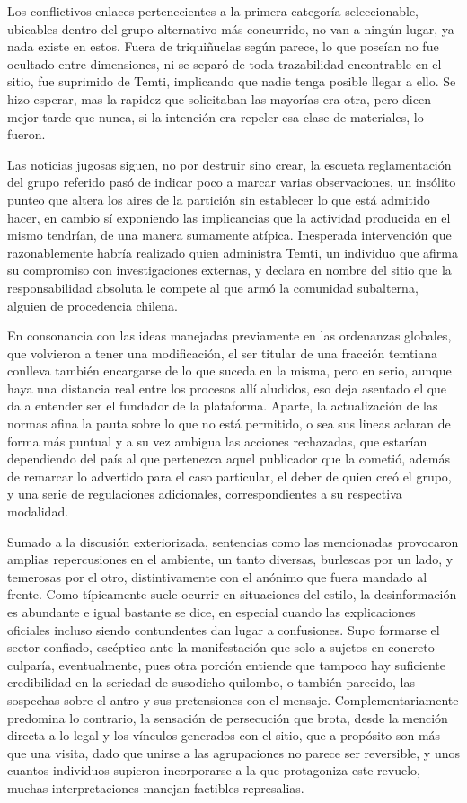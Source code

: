\documentclass[
]{book}
\begin{document}
Los conflictivos enlaces pertenecientes a la primera categoría seleccionable, ubicables dentro del grupo alternativo más concurrido, no van a ningún lugar, ya nada existe en estos. Fuera de triquiñuelas según parece, lo que poseían no fue ocultado entre dimensiones, ni se separó de toda trazabilidad encontrable en el sitio, fue suprimido de Temti, implicando que nadie tenga posible llegar a ello. Se hizo esperar, mas la rapidez que solicitaban las mayorías era otra, pero dicen mejor tarde que nunca, si la intención era repeler esa clase de materiales, lo fueron.

Las noticias jugosas siguen, no por destruir sino crear, la escueta reglamentación del grupo referido pasó de indicar poco a marcar varias observaciones, un insólito punteo que altera los aires de la partición sin establecer lo que está admitido hacer, en cambio sí exponiendo las implicancias que la actividad producida en el mismo tendrían, de una manera sumamente atípica. Inesperada intervención que razonablemente habría realizado quien administra Temti, un individuo que afirma su compromiso con investigaciones externas, y declara en nombre del sitio que la responsabilidad absoluta le compete al que armó la comunidad subalterna, alguien de procedencia chilena.

En consonancia con las ideas manejadas previamente en las ordenanzas globales, que volvieron a tener una modificación, el ser titular de una fracción temtiana conlleva también encargarse de lo que suceda en la misma, pero en serio, aunque haya una distancia real entre los procesos allí aludidos, eso deja asentado el que da a entender ser el fundador de la plataforma. Aparte, la actualización de las normas afina la pauta sobre lo que no está permitido, o sea sus lineas aclaran de forma más puntual y a su vez ambigua las acciones rechazadas, que estarían dependiendo del país al que pertenezca aquel publicador que la cometió, además de remarcar lo advertido para el caso particular, el deber de quien creó el grupo, y una serie de regulaciones adicionales, correspondientes a su respectiva modalidad.

Sumado a la discusión exteriorizada, sentencias como las mencionadas provocaron amplias repercusiones en el ambiente, un tanto diversas, burlescas por un lado, y temerosas por el otro, distintivamente con el anónimo que fuera mandado al frente. Como típicamente suele ocurrir en situaciones del estilo, la desinformación es abundante e igual bastante se dice, en especial cuando las explicaciones oficiales incluso siendo contundentes dan lugar a confusiones. Supo formarse el sector confiado, escéptico ante la manifestación que solo a sujetos en concreto culparía, eventualmente, pues otra porción entiende que tampoco hay suficiente credibilidad en la seriedad de susodicho quilombo, o también parecido, las sospechas sobre el antro y sus pretensiones con el mensaje. Complementariamente predomina lo contrario, la sensación de persecución que brota, desde la mención directa a lo legal y los vínculos generados con el sitio, que a propósito son más que una visita, dado que unirse a las agrupaciones no parece ser reversible, y unos cuantos individuos supieron incorporarse a la que protagoniza este revuelo, muchas interpretaciones manejan factibles represalias.
\end{document}

